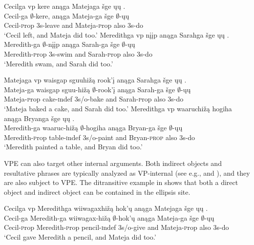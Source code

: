 \documentclass[output=paper]{LSP/langsci}
\begin{document}
\ea\label{ex:johnson:3}
\ea\label{ex:johnson:3a}
\glll Cecilga {\ob}{vp} kere{\cb} anąga Matejaga šge {\ob}ųų{\cb} .\\
Cecil-ga {} $\emptyset$-kere, anąga Mateja-ga šge $\emptyset$-ųų\\
Cecil-{\textsc prop} {} {\textsc 3s}-leave and Mateja-{\textsc prop} also {\textsc 3s}-do\\
\trans `Cecil left, and Mateja did too.'
\ex\label{ex:johnson:3b}
\glll Meredithga {\ob}{vp} nįįp{\cb} anąga Sarahga šge {\ob}ųų{\cb} .\\
Meredith-ga {} $\emptyset$-nįįp anąga Sarah-ga šge $\emptyset$-ųų\\
Meredith-{\textsc prop} {} {\textsc 3s}-swim and Sarah-{\textsc prop} also {\textsc 3s}-do\\
\trans `Meredith swam, and Sarah did too.'
\z
\z

\ea\label{ex:johnson:4}
\ea\label{ex:johnson:4a}
\glll Matejaga {\ob}{vp} {waisgap sguuhižą} rook'į{\cb} anąga Sarahga šge {\ob}ųų{\cb} .\\
Mateja-ga {} {waisgap sguu-hižą} $\emptyset$-rook'į anąga Sarah-ga šge $\emptyset$-ųų\\
Mateja-{\textsc prop} {} cake-{\textsc indef} {\textsc 3s/o}-bake and Sarah-{\textsc prop} also {\textsc 3s}-do\\
\trans `Mateja baked a cake, and Sarah did too.'
\ex\label{ex:johnson:4b}
\glll Meredithga {\ob}{vp} waaruchižą hogiha{\cb} anąga Bryanga šge {\ob}ųų{\cb} .\\
Meredith-ga {} waaruc-hižą $\emptyset$-hogiha anąga Bryan-ga šge $\emptyset$-ųų\\
Meredith-{\textsc prop} {} table-{\textsc indef} {\textsc 3s/o}-paint and Bryan-\textsc{prop} also {\textsc 3s}-do\\
\trans `Meredith painted a table, and Bryan did too.'
\z
\z

VPE can also target other internal arguments. Both indirect objects and resultative phrases are typically analyzed as VP-internal (see e.g., \citealt{Larson1988} and \citealt{LevinRappaportHovav1995}), and they are also subject to VPE. The ditransitive example in  shows that both a direct object and indirect object can be contained in the ellipsis site.


\ea\label{ex:johnson:5}
\glll Cecilga {\ob}{vp} Meredithga wiiwagaxhižą hok'ų{\cb} anąga Matejaga šge {\ob}ųų{\cb} .\\
Cecil-ga {} Meredith-ga wiiwagax-hižą $\emptyset$-hok'ų anąga Mateja-ga šge $\emptyset$-ųų\\
Cecil-{\textsc prop} {} Meredith-{\textsc prop} pencil-{\textsc indef} {\textsc 3s/o}-give and Mateja-{\textsc prop} also {\textsc 3s}-do\\
\trans `Cecil gave Meredith a pencil, and Mateja did too.'
\z
\end{document}
